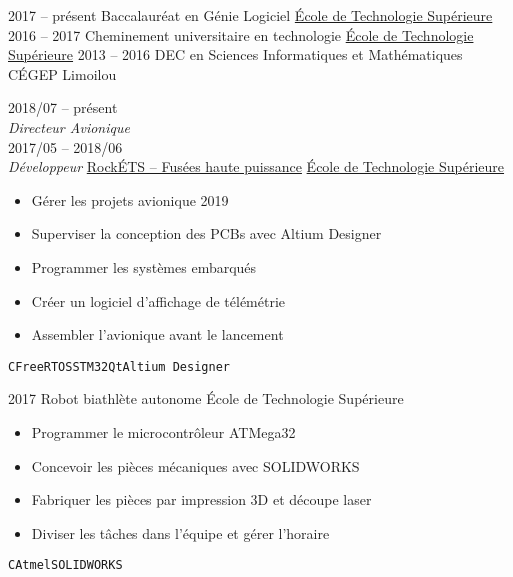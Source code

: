 \documentclass[9pt]{developercv} %
\begin{document}
\begin{minipage}[t]{0.8\textwidth}

\begin{entrylist}
	\entry
		{2017 -- présent}
		{Baccalauréat en Génie Logiciel}
		{\href{https://etsmtl.ca}{École de Technologie Supérieure}}
		{\vspace{-14pt}}
	\entry
		{2016 -- 2017}
		{Cheminement universitaire en technologie}
		{\href{https://etsmtl.ca}{École de Technologie Supérieure}}
		{\vspace{-14pt}}
	\entry
		{2013 -- 2016}
		{DEC en Sciences Informatiques et Mathématiques}
		{CÉGEP Limoilou}
		{\vspace{-14pt}}
\end{entrylist}



\begin{entrylist}
	\entry
		{2018/07 -- présent\\{\small\emph{Directeur Avionique}}\\2017/05 -- 2018/06\\{\small\emph{Développeur}}}
		{\href{https://clubrockets.ca/}{RockÉTS -- Fusées haute puissance}}
		{\href{https://clubrockets.ca/}{École de Technologie Supérieure}}
		{
			\vspace{-14pt}
			\begin{itemize}
				\renewcommand{\labelitemi}{\raisebox{.45ex}{\rule{.6ex}{.6ex}}}
				\setlength\itemsep{-1pt}
				\item Gérer les projets avionique 2019
				\item Superviser la conception des PCBs avec Altium Designer
				\item Programmer les systèmes embarqués
				\item Créer un logiciel d'affichage de télémétrie
				\item Assembler l'avionique avant le lancement
			\end{itemize}
			\vspace{-4pt}
			\texttt{C}\slashsep\texttt{FreeRTOS}\slashsep\texttt{STM32}\slashsep\texttt{Qt}\slashsep\texttt{Altium Designer}
		}
	\entry
		{2017}
		{Robot biathlète autonome}
		{École de Technologie Supérieure}
		{
			\vspace{-14pt}
			\begin{itemize}
				\renewcommand{\labelitemi}{\raisebox{.45ex}{\rule{.6ex}{.6ex}}}
				\setlength\itemsep{-1pt}
				\item Programmer le microcontrôleur ATMega32
				\item Concevoir les pièces mécaniques avec SOLIDWORKS
				\item Fabriquer les pièces par impression 3D et découpe laser
				\item Diviser les tâches dans l'équipe et gérer l'horaire
			\end{itemize}
			\vspace{-4pt}
			\texttt{C}\slashsep\texttt{Atmel}\slashsep\texttt{SOLIDWORKS}
		}
\end{entrylist}


\end{minipage}
\end{document}

